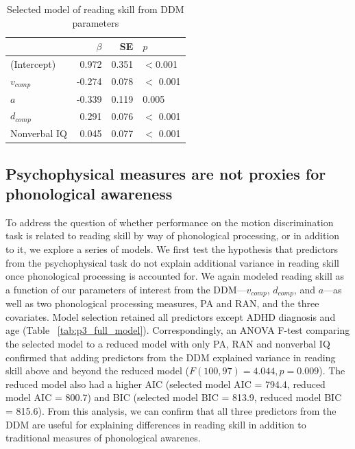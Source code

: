 \documentclass[../uwthesis.tex]{subfiles}
\begin{document}
\begin{table}
\caption{Selected model of reading skill from DDM parameters}
\label{tab:p3_drift_rate_model}
\centering
    \begin{tabular}{lrrl}
    \toprule
      & $\beta$ & SE & $p$\\
    \midrule
    (Intercept) & 0.972 & 0.351 & $<$0.001\\
    $v_{comp}$ & -0.274 & 0.078 & $<$ 0.001\\
    $a$ & -0.339 & 0.119 &  0.005\\
    $d_{comp}$ & 0.291 & 0.076 & $<$ 0.001\\
    Nonverbal IQ & 0.045 & 0.077 & $<$ 0.001\\
    \bottomrule
    \end{tabular}
\end{table}

\subsection{Psychophysical measures are not proxies for phonological awareness}

To address the question of whether performance on the motion discrimination task is related to reading skill by way of phonological processing, or in addition to it, we explore a series of models. We first test the hypothesis that predictors from the psychophysical task do not explain
additional variance in reading skill once phonological processing is accounted for. We again modeled reading skill as a function of our parameters of interest from the DDM—$v_{comp}$, $d_{comp}$, and $a$—as well as two phonological processing measures, PA and RAN, and the three covariates.
Model selection retained all predictors except ADHD diagnosis and age (Table ~\ref{tab:p3_full_model}). Correspondingly, an ANOVA F-test comparing the selected model to a reduced model with only PA, RAN and nonverbal IQ confirmed that adding predictors from the DDM explained variance in reading skill above and beyond the reduced model ($F(100, 97) = 4.044, p = 0.009$). The reduced model also
had a higher AIC (selected model AIC = 794.4, reduced model AIC = 800.7) and BIC (selected model BIC = 813.9, reduced model BIC = 815.6). From this analysis, we can confirm that all three predictors from the DDM are useful for explaining differences in reading skill in addition to traditional measures of phonological awarenes.
\end{document}
